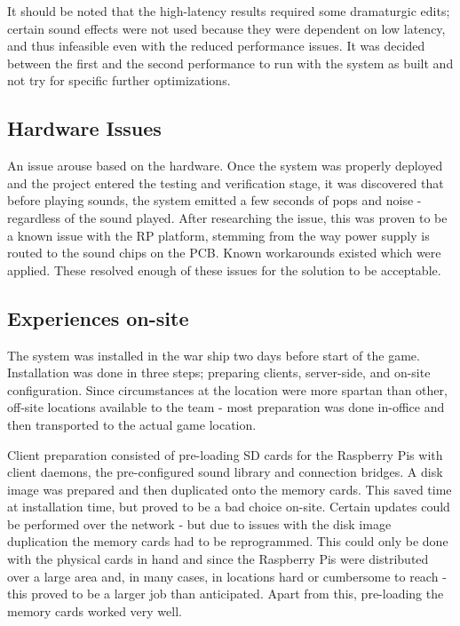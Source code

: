 It should be noted that the high-latency results required some
dramaturgic edits; certain sound effects were not used because they
were dependent on low latency, and thus infeasible even with the
reduced performance issues. It was decided between the first and the
second performance to run with the system as built and not try for
specific further optimizations.

\subsection{Hardware Issues}
\label{sec:hardware-issues}
An issue arouse based on the hardware. Once the system was properly deployed and the project entered
the testing and verification stage, it was discovered that before playing sounds, the system emitted a few seconds of pops and noise - regardless of the sound played. After researching the issue, this was proven to be a known issue with the RP platform, stemming from the way power supply is routed to the sound chips on the PCB. Known workarounds existed which were applied. These resolved enough of these issues for the solution to be acceptable.

\subsection{Experiences on-site}
\label{sec:experiences-on-site}

The system was installed in the war ship two days before start of the game. Installation was done in three steps; preparing clients, server-side, and on-site configuration. Since circumstances at the location were more spartan than other, off-site locations available to the team - most preparation was done in-office and then transported to the actual game location. 

Client preparation consisted of pre-loading SD cards for the Raspberry Pis with client daemons, the pre-configured sound library and connection bridges. A disk image was prepared and then duplicated onto the memory cards. This saved time at installation time, but proved to be a bad choice on-site. Certain updates could be performed over the network - but due to issues with the disk image duplication the memory cards had to be reprogrammed. This could only be done with the physical cards in hand and since the Raspberry Pis were distributed over a large area and, in many cases, in locations hard or cumbersome to reach - this proved to be a larger job than anticipated. Apart from this, pre-loading the memory cards worked very well. 

